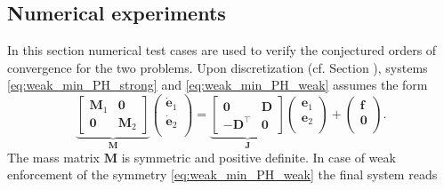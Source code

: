 \subsection{Numerical experiments}
\label{sec:numerics_mixed}
In this section numerical test cases are used to verify the conjectured orders of convergence for the two problems. Upon discretization (cf. Section ), systems \eqref{eq:weak_min_PH_strong} and \eqref{eq:weak_min_PH_weak} assumes the form 
\begin{equation*}
\underbrace{
\begin{bmatrix}
\mathbf{M}_1 & \mathbf{0} \\
\mathbf{0} & \mathbf{M}_2
\end{bmatrix}}_{\mathbf{M}}
\begin{pmatrix}
\dot{\mathbf{e}}_1 \\
\dot{\mathbf{e}}_2 \\
\end{pmatrix} = 
\underbrace{
\begin{bmatrix}
\mathbf{0} & \mathbf{D} \\
-\mathbf{D}^\top & \mathbf{0}
\end{bmatrix}}_{\mathbf{J}}
\begin{pmatrix}
{\mathbf{e}}_1 \\
{\mathbf{e}}_2 \\
\end{pmatrix} + 
\begin{pmatrix}
\mathbf{f} \\
\mathbf{0} \\
\end{pmatrix}. 
\end{equation*}
The mass matrix $\mathbf{M}$ is symmetric and positive definite. In case of weak enforcement of the symmetry \eqref{eq:weak_min_PH_weak} the final system reads
